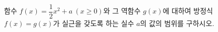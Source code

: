 함수 $f(x)=\dfrac{1}{2}x^2+a\ (x\ge 0)$와 그 역함수 $g(x)$에 대하여 방정식 $f(x)=g(x)$가 실근을 갖도록 하는 실수 $a$의 값의 범위를 구하시오.
